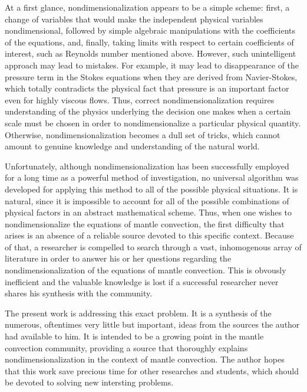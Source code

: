 \documentclass[oneside]{amsbook}
\theoremstyle{definition}
\theoremstyle{remark}
\numberwithin{section}{chapter}
\numberwithin{equation}{chapter}
\begin{document}
At a first glance, nondimensionalization appears to be a simple scheme: first, a change of variables that would make the independent physical variables nondimensional, followed by simple algebraic manipulations with the coefficients of the equations, and, finally, taking limits with respect to certain coefficients of interest, such as Reynolds number mentioned above. However, such unintelligent approach may lead to mistakes. For example, it may lead to disappearance of the pressure term in the Stokes equations when they are derived from Navier-Stokes, which totally contradicts the physical fact that pressure is an important factor even for highly viscous flows. Thus, correct nondimensionalization requires understanding of the physics underlying the decision one makes when a certain scale must be chosen in order to nondimensionalize a particular physical quantity. Otherwise, nondimensionalization becomes a dull set of tricks, which cannot amount to genuine knowledge and understanding of the natural world.

Unfortunately, although nondimensionalization has been successfully employed for a long time as a powerful method of investigation, no universal algorithm was developed for applying this method to all of the possible physical situations. It is natural, since it is impossible to account for all of the possible combinations of physical factors in an abstract mathematical scheme. Thus, when one wishes to nondimensionalize the equations of mantle convection, the first difficulty that arises is an absence of a reliable source devoted to this specific context. Because of that, a researcher is compelled to search through a vast, inhomogenous array of literature in order to answer his or her questions regarding the nondimensionalization of the equations of mantle convection. This is obvously inefficient and the valuable knowledge is lost if a successful researcher never shares his synthesis with the community.

The present work is addressing this exact problem. It is a synthesis of the numerous, oftentimes very little but important, ideas from the sources the author had available to him. It is intended to be a growing point in the mantle convection community, providing a source that thoroughly explains nondimensionalization in the context of mantle convection. The author hopes that this work save precious time for other researches and students, which should be devoted to solving new intersting problems.
\end{document}

